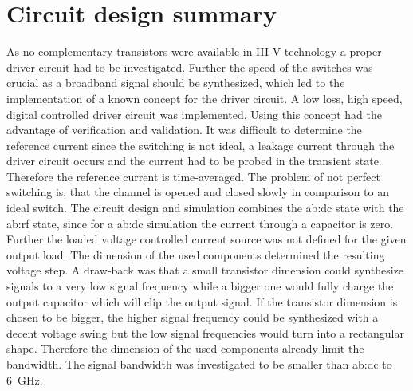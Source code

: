 \section{Circuit design summary}
As no complementary transistors were available in III-V technology a proper driver circuit had to be investigated.
Further the speed of the switches was crucial as a broadband signal should be synthesized, which led to the implementation of a known concept \cite{MaksimovicPaper} for the driver circuit.
A low loss, high speed, digital controlled driver circuit was implemented.
Using this concept had the advantage of verification and validation.
It was difficult to determine the reference current since the switching is not ideal, a leakage current through the driver circuit occurs and the current had to be probed in the transient state.
Therefore the reference current is time-averaged.
The problem of not perfect switching is, that the channel is opened and closed slowly in comparison to an ideal switch.
The circuit design and simulation combines the \gls{ab:dc} state with the \gls{ab:rf} state, since for a \gls{ab:dc} simulation the current through a capacitor is zero.
Further the loaded voltage controlled current source was not defined for the given output load.
The dimension of the used components determined the resulting voltage step.
A draw-back was that a small transistor dimension could synthesize signals to a very low signal frequency while a bigger one would fully charge the output capacitor which will clip the output signal.
If the transistor dimension is chosen to be bigger, the higher signal frequency could be synthesized with a decent voltage swing but the low signal frequencies would turn into a rectangular shape. 
Therefore the dimension of the used components already limit the bandwidth.
The signal bandwidth was investigated to be smaller than \gls{ab:dc} to \SI{6}{\GHz}.


